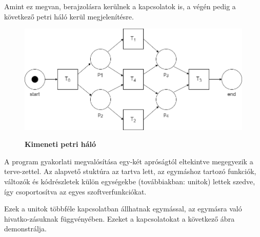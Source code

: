 \begin{example}
	Amint ez megvan, berajzolásra kerülnek a kapcsolatok is, a végén pedig a következő petri háló kerül megjelenítésre.
	\newpage

	\begin{figure}[h!]
	\begin{center}
	\caption{\textbf{Kimeneti petri háló}}
	\includegraphics[width=\textwidth,keepaspectratio=true]{images/img_plan_2}
	\label{fig:plan}
	\end{center}
	\end{figure}


\end{example}

\lstset{style=delphicode}



A program gyakorlati megvalósítása egy-két apróságtól eltekintve megegyezik a terve\hyp{}zettel. Az alapvető stuktúra az tartva lett, az egymáshoz tartozó funkciók, változók és kódrészletek külön egységekbe (továbbiakban: unitok) lettek szedve, így csoportosítva az egyes szoftverfunkciókat.

Ezek a unitok többféle kapcsolatban állhatnak egymással, az egymásra való hivatko\hyp{}zásuknak függvényében. Ezeket a kapcsolatokat a következő ábra demonstrálja.

